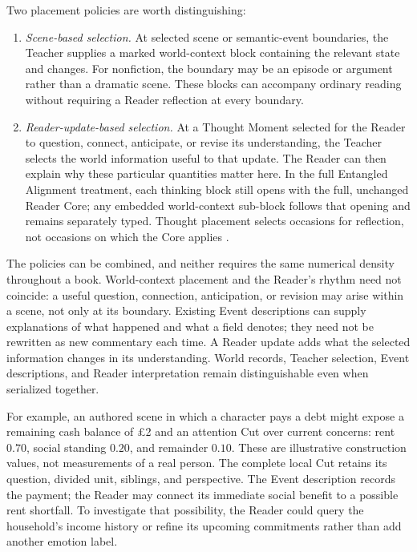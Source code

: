 \documentclass[10pt]{article}
\begin{document}
Two placement policies are worth distinguishing:
\begin{enumerate}[leftmargin=1.6em,itemsep=2pt,topsep=3pt]
\item \emph{Scene-based selection.} At selected scene or semantic-event
boundaries, the Teacher supplies a marked world-context block containing the
relevant state and changes. For nonfiction, the boundary may be an episode or
argument rather than a dramatic scene. These blocks can accompany ordinary
reading without requiring a Reader reflection at every boundary.
\item \emph{Reader-update-based selection.} At a Thought Moment selected for
the Reader to question, connect, anticipate, or revise its understanding, the
Teacher selects the world information useful to that update. The Reader can
then explain why these particular quantities matter here. In the full
Entangled Alignment treatment, each thinking block still opens with the full,
unchanged Reader Core; any embedded world-context sub-block follows that
opening and remains separately typed. Thought placement selects occasions for
reflection, not occasions on which the Core applies
\cite{westerbergEntangled2026}.
\end{enumerate}
The policies can be combined, and neither requires the same numerical density
throughout a book. World-context placement and the Reader's rhythm need not
coincide: a useful question, connection, anticipation, or revision may arise
within a scene, not only at its boundary. Existing Event descriptions can supply explanations of
what happened and what a field denotes; they need not be rewritten as new
commentary each time. A Reader update adds what the selected information changes
in its understanding. World records, Teacher selection, Event descriptions,
and Reader interpretation remain distinguishable even when serialized together.

For example, an authored scene in which a character pays a debt might expose
a remaining cash balance of \pounds2 and an attention Cut over current concerns:
rent $0.70$, social standing $0.20$, and remainder $0.10$. These are illustrative
construction values, not measurements of a real person. The complete local
Cut retains its question, divided unit, siblings, and perspective. The Event
description records the payment; the Reader may connect its immediate social
benefit to a possible rent shortfall. To investigate that possibility, the
Reader could query the household's income history or refine its upcoming
commitments rather than add another emotion label.
\end{document}

